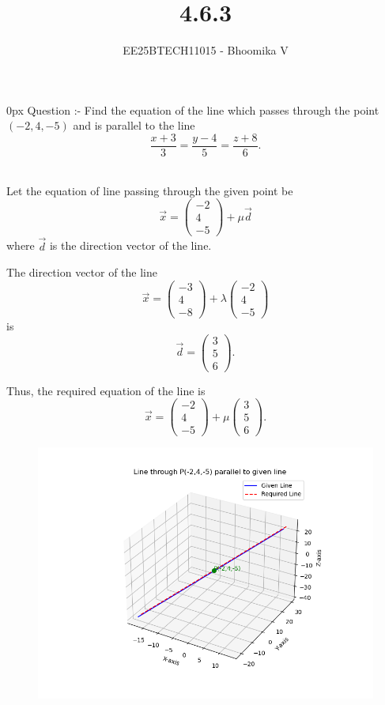 \documentclass[journal]{IEEEtran}
\begin{document}

\vspace{3cm}

\title{4.6.3}
\author{EE25BTECH11015 - Bhoomika V}
{\let\newpage\relax\maketitle}

\renewcommand{\thefigure}{\theenumi}
\renewcommand{\thetable}{\theenumi}
\setlength{\intextsep}{10pt} %


\renewcommand{\thetable}{\theenumi}
\parindent 0px 
{Question :-} 
Find the equation of the line which passes through the point $(-2,4,-5)$ and is parallel to the line
\[
\frac{x+3}{3} = \frac{y-4}{5} = \frac{z+8}{6}.
\]

\solution \\ 

Let the equation of line passing through the given point be
\[
\vec{x} = 
\begin{pmatrix}
-2 \\ 4 \\ -5
\end{pmatrix}
+ \mu \vec{d}
\]
where $\vec{d}$ is the direction vector of the line.  

The direction vector of the line 
\[
\vec{x} = 
\begin{pmatrix}
-3 \\ 4 \\ -8
\end{pmatrix}
+ \lambda
\begin{pmatrix}
-2 \\ 4 \\ -5
\end{pmatrix}
\]
is
\[
\vec{d} = 
\begin{pmatrix}
3 \\ 5 \\ 6
\end{pmatrix}.
\tag{1}
\]

Thus, the required equation of the line is
\[
\vec{x} =
\begin{pmatrix}
-2 \\ 4 \\ -5
\end{pmatrix}
+ \mu 
\begin{pmatrix}
3 \\ 5 \\ 6
\end{pmatrix}.
\]
\begin{figure}[H]
\begin{center}
\includegraphics[width=0.6\columnwidth]{Figs/Fig1.png}
\end{center}
\caption{}
\label{fig:Fig.1}
\end{figure}
\end{document}
